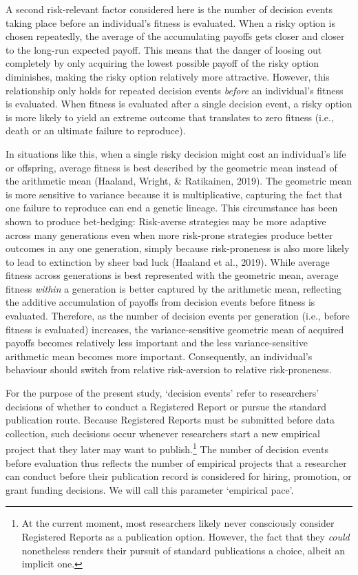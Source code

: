 \documentclass[
  ,man,mask,floatsintext]{apa6}
\begin{document}
A second risk-relevant factor considered here is the number of decision events taking place before an individual's fitness is evaluated.
When a risky option is chosen repeatedly, the average of the accumulating payoffs gets closer and closer to the long-run expected payoff.
This means that the danger of loosing out completely by only acquiring the lowest possible payoff of the risky option diminishes, making the risky option relatively more attractive.
However, this relationship only holds for repeated decision events \emph{before} an individual's fitness is evaluated.
When fitness is evaluated after a single decision event, a risky option is more likely to yield an extreme outcome that translates to zero fitness (i.e., death or an ultimate failure to reproduce).

In situations like this, when a single risky decision might cost an individual's life or offspring, average fitness is best described by the geometric mean instead of the arithmetic mean (Haaland, Wright, \& Ratikainen, 2019).
The geometric mean is more sensitive to variance because it is multiplicative, capturing the fact that one failure to reproduce can end a genetic lineage.
This circumstance has been shown to produce bet-hedging:
Risk-averse strategies may be more adaptive across many generations even when more risk-prone strategies produce better outcomes in any one generation, simply because risk-proneness is also more likely to lead to extinction by sheer bad luck (Haaland et al., 2019).
While average fitness across generations is best represented with the geometric mean, average fitness \emph{within} a generation is better captured by the arithmetic mean, reflecting the additive accumulation of payoffs from decision events before fitness is evaluated.
Therefore, as the number of decision events per generation (i.e., before fitness is evaluated) increases, the variance-sensitive geometric mean of acquired payoffs becomes relatively less important and the less variance-sensitive arithmetic mean becomes more important.
Consequently, an individual's behaviour should switch from relative risk-aversion to relative risk-proneness.

For the purpose of the present study, `decision events' refer to researchers' decisions of whether to conduct a Registered Report or pursue the standard publication route.
Because Registered Reports must be submitted before data collection, such decisions occur whenever researchers start a new empirical project that they later may want to publish.\footnote{At the current moment, most researchers likely never consciously consider Registered Reports as a publication option. However, the fact that they \emph{could} nonetheless renders their pursuit of standard publications a choice, albeit an implicit one.}
The number of decision events before evaluation thus reflects the number of empirical projects that a researcher can conduct before their publication record is considered for hiring, promotion, or grant funding decisions.
We will call this parameter `empirical pace'.
\end{document}
